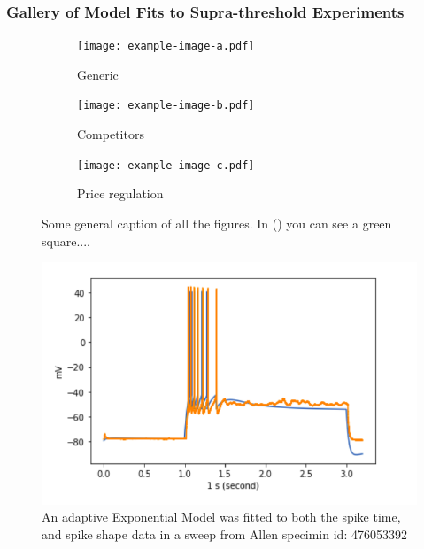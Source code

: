 \subsubsection{Gallery of Model Fits to Supra-threshold Experiments}

\begin{figure}
    \centering
    \begin{subfigure}[t]{0.45\textwidth}
        \centering
        \texttt{[image: example-image-a.pdf]} 
        \caption{Generic} \label{fig:timing1}
    \end{subfigure}
    \hfill
    \begin{subfigure}[t]{0.45\textwidth}
        \centering
        \texttt{[image: example-image-b.pdf]} 
        \caption{Competitors} \label{fig:timing2}
    \end{subfigure}

    \vspace{1cm}
    \begin{subfigure}[t]{0.45\textwidth}
        \centering
        \texttt{[image: example-image-c.pdf]} 
        \caption{Price regulation} \label{fig:timing3}
    \end{subfigure}
    \hfill
    \begin{subfigure}[t]{0.45\textwidth}
    \end{subfigure}
    \caption{Some general caption of all the figures. In () you can see a  green square....}
\end{figure}


\begin{figure}
    \centering
    \includegraphics[scale=0.75]{figures/adexp_fit_allen_spec_id_476053392.png}
    \caption{An adaptive Exponential Model was fitted to both the spike time, and spike shape data in a sweep from Allen specimin id: 476053392} \label{fig:specimen_476053392}
\end{figure}

